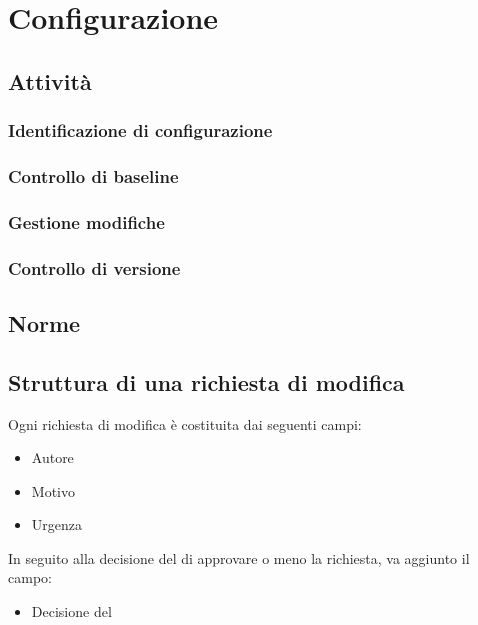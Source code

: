 \section{Configurazione}
	\subsection{Attività}
		\subsubsection{Identificazione di configurazione}
		\subsubsection{Controllo di baseline}
		\subsubsection{Gestione modifiche}
		\subsubsection{Controllo di versione}
	
	\subsection{Norme}
		\subsection{Struttura di una richiesta di modifica}
			Ogni richiesta di modifica è costituita dai seguenti campi:
			\begin{itemize}
				\item Autore
				\item Motivo
				\item Urgenza
			\end{itemize}
			In seguito alla decisione del  di approvare o meno la richiesta, va aggiunto il campo:
			\begin{itemize}
				\item Decisione del 
			\end{itemize}
			
